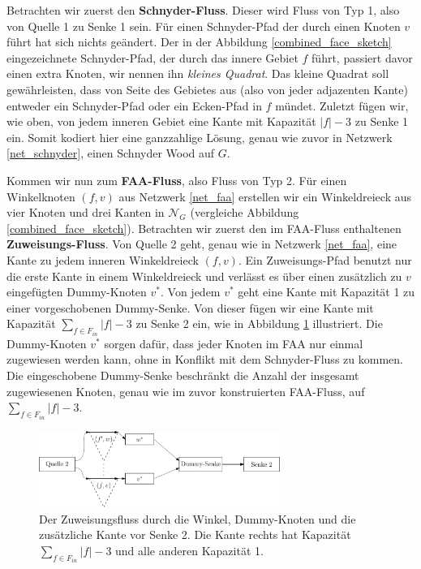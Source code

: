Betrachten wir zuerst den \textbf{Schnyder-Fluss}. Dieser wird Fluss von Typ 1, also von Quelle 1 zu Senke 1 sein. Für einen Schnyder-Pfad der durch einen Knoten $v$ führt hat sich nichts geändert. Der in der Abbildung \ref{combined_face_sketch} eingezeichnete Schnyder-Pfad, der durch das innere Gebiet $f$ führt, passiert davor einen extra Knoten, wir nennen ihn \textit{kleines Quadrat}. Das kleine Quadrat soll gewährleisten, dass von Seite des Gebietes aus (also von jeder adjazenten Kante) entweder ein Schnyder-Pfad oder ein Ecken-Pfad in $f$ mündet. Zuletzt fügen wir, wie oben, von jedem inneren Gebiet eine Kante mit Kapazität $|f|-3$ zu Senke 1 ein. Somit kodiert hier eine ganzzahlige Lösung, genau wie zuvor in Netzwerk \ref{net_schnyder}, einen Schnyder Wood auf $G$.

Kommen wir nun zum \textbf{FAA-Fluss}, also Fluss von Typ 2. Für einen Winkelknoten $(f,v)$ aus Netzwerk \ref{net_faa} erstellen wir ein Winkeldreieck aus vier Knoten und drei Kanten in $\mathcal{N}_G$ (vergleiche Abbildung \ref{combined_face_sketch}). Betrachten wir zuerst den im FAA-Fluss enthaltenen \textbf{Zuweisungs-Fluss}. Von Quelle 2 geht, genau wie in Netzwerk \ref{net_faa}, eine Kante zu jedem inneren Winkeldreieck $(f,v)$. Ein Zuweisungs-Pfad benutzt nur die erste Kante in einem Winkeldreieck und verlässt es über einen zusätzlich zu $v$ eingefügten Dummy-Knoten $v^*$. Von jedem $v^*$ geht eine Kante mit Kapazität 1 zu einer vorgeschobenen Dummy-Senke. Von dieser fügen wir eine Kante mit Kapazität $\sum_{f \in F_{in}} |f|-3$ zu Senke 2 ein, wie in Abbildung \ref{dummy_sink} illustriert. Die Dummy-Knoten $v^*$ sorgen dafür, dass jeder Knoten im FAA nur einmal zugewiesen werden kann, ohne in Konflikt mit dem Schnyder-Fluss zu kommen. Die eingeschobene Dummy-Senke beschränkt die Anzahl der insgesamt zugewiesenen Knoten, genau wie im zuvor konstruierten FAA-Fluss, auf $\sum_{f \in F_{in}} |f|-3$.

\begin{figure}[h]
	\centering
  	\includegraphics[width=0.7\textwidth]{dummy_sink.png}
  	\caption{Der Zuweisungsfluss durch die Winkel, Dummy-Knoten und die zusätzliche Kante vor Senke 2. Die Kante rechts hat Kapazität $\sum_{f \in F_{in}} |f|-3$ und alle anderen Kapazität 1.}
	\label{dummy_sink}
\end{figure}

